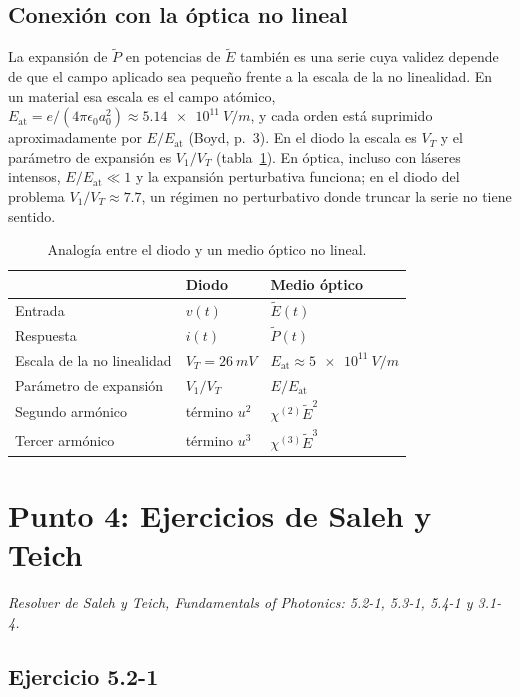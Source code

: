 \documentclass{article}
\newcommand{\VT}{V_T}
\begin{document}
\subsection*{Conexión con la óptica no lineal}

La expansión de $\tilde P$ en potencias de $\tilde E$ también es una serie cuya validez depende de que
el campo aplicado sea pequeño frente a la escala de la no linealidad. En un material esa escala es el
campo atómico, $E_{\text{at}}=e/(4\pi\epsilon_0a_0^2)\approx\SI{5.14e11}{V/m}$, y cada orden está
suprimido aproximadamente por $E/E_{\text{at}}$ (Boyd, p.~3). En el diodo la escala es $\VT$ y
el parámetro de expansión es $V_1/\VT$ (tabla~\ref{tab:analogia}). En óptica, incluso con láseres
intensos, $E/E_{\text{at}}\ll1$ y la expansión perturbativa funciona; en el diodo del problema
$V_1/\VT\approx7.7$, un régimen no perturbativo donde truncar la serie no tiene sentido.

\begin{table}[H]
\centering
\caption{Analogía entre el diodo y un medio óptico no lineal.}
\label{tab:analogia}
\begin{tabular}{@{}lll@{}}
\toprule
& Diodo & Medio óptico \\
\midrule
Entrada & $v(t)$ & $\tilde E(t)$ \\
Respuesta & $i(t)$ & $\tilde P(t)$ \\
Escala de la no linealidad & $\VT=\SI{26}{mV}$ & $E_{\text{at}}\approx\SI{5e11}{V/m}$ \\
Parámetro de expansión & $V_1/\VT$ & $E/E_{\text{at}}$ \\
Segundo armónico & término $u^2$ & $\chi^{(2)}\tilde E^2$ \\
Tercer armónico & término $u^3$ & $\chi^{(3)}\tilde E^3$ \\
\bottomrule
\end{tabular}
\end{table}

\newpage
\section{Punto 4: Ejercicios de Saleh y Teich}

\emph{Resolver de Saleh y Teich, Fundamentals of Photonics: 5.2-1, 5.3-1, 5.4-1 y
3.1-4.}

\subsection{Ejercicio 5.2-1}
\end{document}
